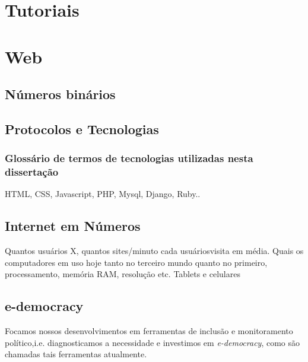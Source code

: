 \section{Tutoriais}

\section{Web}

\subsection{Números binários}

\subsection{Protocolos e Tecnologias}

\subsubsection{Glossário de termos de tecnologias utilizadas nesta dissertação}
HTML, CSS, Javascript, PHP, Mysql, Django, Ruby..

\subsection{Internet em Números}
Quantos usuários X, quantos sites/minuto cada usuáriosvisita em média.
Quais os computadores em uso hoje tanto no terceiro mundo quanto no primeiro,
processamento, memória RAM, resolução etc.
Tablets e celulares

\subsection{e-democracy}
Focamos nossos desenvolvimentos em ferramentas de inclusão
e monitoramento político,i.e. diagnosticamos a necessidade
e investimos em \emph{e-democracy}, como são chamadas tais ferramentas atualmente.
